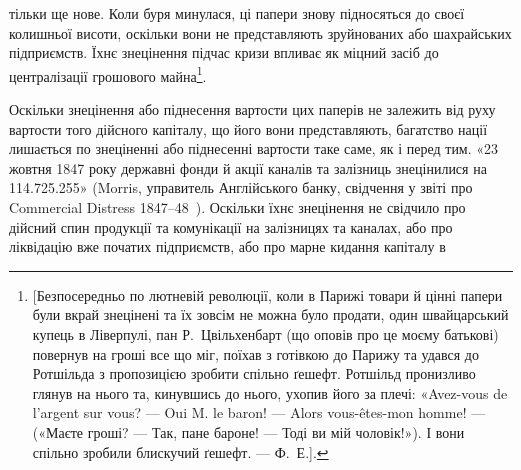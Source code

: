 тільки ще нове. Коли буря минулася, ці папери знову підносяться до своєї
колишньої висоти, оскільки вони не представляють зруйнованих або шахрайських
підприємств. Їхнє знецінення підчас кризи впливає як міцний засіб до централізації
грошового майна\footnote{[Безпосередньо по лютневій революції, коли в Парижі товари й цінні папери були вкрай
знецінені та їх зовсім не можна було продати, один швайцарський купець в Ліверпулі, пан Р.~Цвільхенбарт
(що оповів про це моєму батькові) повернув на гроші все що міг, поїхав з готівкою до Парижу
та удався до Ротшільда з пропозицією зробити спільно ґешефт. Ротшільд пронизливо глянув на нього та,
кинувшись до нього, ухопив його за плечі: «Avez-vous de l’argent sur vous? — Oui M. le baron! —
Alors vous-êtes-mon homme! — («Маєте гроші? — Так, пане бароне! — Тоді ви мій чоловік!»).
І вони спільно зробили блискучий ґешефт. — Ф.~Е.].}.

Оскільки знецінення або піднесення вартости цих паперів не залежить
від руху вартости того дійсного капіталу, що його вони представляють, багатство
нації лишається по знеціненні або піднесенні вартости таке саме, як і перед
тим. «23 жовтня 1847 року державні фонди й акції каналів та залізниць знецінилися
на \num{114.725.255}» (Morris, управитель Англійського банку, свідчення
у звіті про Commercial Distress 1847--48~). Оскільки їхнє знецінення не
свідчило про дійсний спин продукції та комунікації на залізницях та каналах,
або про ліквідацію вже початих підприємств, або про марне кидання капіталу в
\parbreak{}  %

